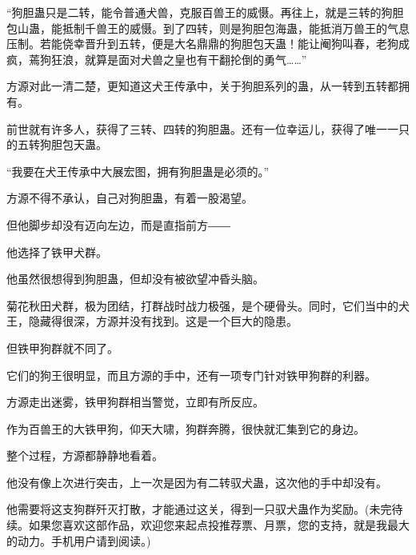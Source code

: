 \begin{this_body}
“狗胆蛊只是二转，能令普通犬兽，克服百兽王的威慑。再往上，就是三转的狗胆包山蛊，能抵制千兽王的威慑。到了四转，则是狗胆包海蛊，能抵消万兽王的气息压制。若能侥幸晋升到五转，便是大名鼎鼎的狗胆包天蛊！能让阉狗叫春，老狗成疯，蔫狗狂浪，就算是面对犬兽之皇也有干翻抡倒的勇气……”

方源对此一清二楚，更知道这犬王传承中，关于狗胆系列的蛊，从一转到五转都拥有。

前世就有许多人，获得了三转、四转的狗胆蛊。还有一位幸运儿，获得了唯一一只的五转狗胆包天蛊。

“我要在犬王传承中大展宏图，拥有狗胆蛊是必须的。”

方源不得不承认，自己对狗胆蛊，有着一股渴望。

但他脚步却没有迈向左边，而是直指前方――

他选择了铁甲犬群。

他虽然很想得到狗胆蛊，但却没有被欲望冲昏头脑。

菊花秋田犬群，极为团结，打群战时战力极强，是个硬骨头。同时，它们当中的犬王，隐藏得很深，方源并没有找到。这是一个巨大的隐患。

但铁甲狗群就不同了。

它们的狗王很明显，而且方源的手中，还有一项专门针对铁甲狗群的利器。

方源走出迷雾，铁甲狗群相当警觉，立即有所反应。

作为百兽王的大铁甲狗，仰天大啸，狗群奔腾，很快就汇集到它的身边。

整个过程，方源都静静地看着。

他没有像上次进行突击，上一次是因为有二转驭犬蛊，这次他的手中却没有。

他需要将这支狗群歼灭打散，才能通过这关，得到一只驭犬蛊作为奖励。(未完待续。如果您喜欢这部作品，欢迎您来起点投推荐票、月票，您的支持，就是我最大的动力。手机用户请到阅读。)

\end{this_body}


